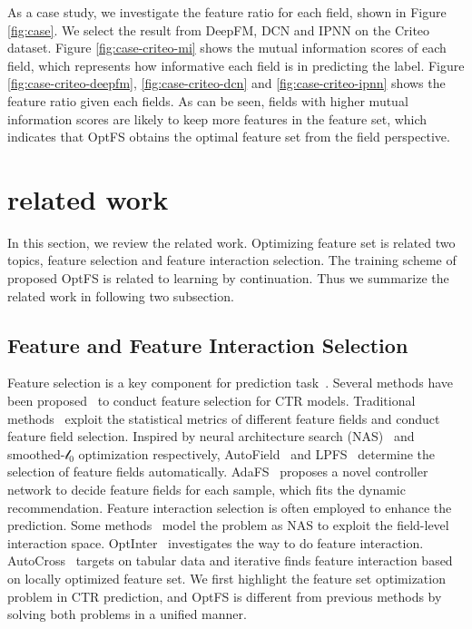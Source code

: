 \documentclass[sigconf]{acmart}
\begin{document}
As a case study, we investigate the feature ratio for each field, shown in Figure \ref{fig:case}. We select the result from DeepFM, DCN and IPNN on the Criteo dataset. Figure \ref{fig:case-criteo-mi} shows the mutual information scores of each field, which represents how informative each field is in predicting the label. Figure \ref{fig:case-criteo-deepfm}, \ref{fig:case-criteo-dcn} and \ref{fig:case-criteo-ipnn} shows the feature ratio given each fields. As can be seen, fields with higher mutual information scores are likely to keep more features in the feature set, which indicates that OptFS obtains the optimal feature set from the field perspective.

\vspace{-3pt}
 \section{related work}
\label{sec:rw}

In this section, we review the related work. Optimizing feature set is related two topics, feature selection and feature interaction selection. The training scheme of proposed OptFS is related to learning by continuation. Thus we summarize the related work in following two subsection.

\vspace{-3pt}

\subsection{Feature and Feature Interaction Selection}
Feature selection is a key component for prediction task~\cite{DFS}. Several methods have been proposed~\cite{LASSO, MCF, AutoField, LPFS, AdaFS} to conduct feature selection for CTR models. Traditional methods~\cite{LASSO, MCF} exploit the statistical metrics of different feature fields and conduct feature field selection. Inspired by neural architecture search (NAS)~\cite{DARTS, NAO} and smoothed-$\mathcal{l}_0$ optimization respectively, AutoField~\cite{AutoField} and LPFS~\cite{LPFS} determine the selection of feature fields automatically. AdaFS~\cite{AdaFS} proposes a novel controller network to decide feature fields for each sample, which fits the dynamic recommendation.
Feature interaction selection is often employed to enhance the prediction. Some methods~\cite{AutoFIS, AutoFeature} model the problem as NAS to exploit the field-level interaction space. OptInter~\cite{OptInter} investigates the way to do feature interaction. AutoCross~\cite{AutoCross} targets on tabular data and iterative finds feature interaction based on locally optimized feature set.
We first highlight the feature set optimization problem in CTR prediction, and OptFS is different from previous methods by solving both problems in a unified manner.
\end{document}
